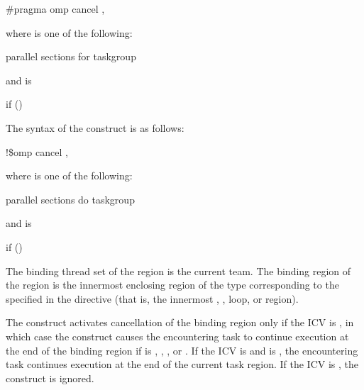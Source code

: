 {{{{\begin{boxedcode}
\#pragma omp cancel \plc{construct-type-clause [ [},\plc{] if-clause] new-line}
\end{boxedcode}

\begin{samepage}
where  is one of the following:

\begin{indentedcodelist}
parallel
sections
for
taskgroup
\end{indentedcodelist}
\end{samepage}

and  is
\begin{indentedcodelist}
if ()
\end{indentedcodelist}
\ccppspecificend

\fortranspecificstart
The syntax of the  construct is as follows:

\begin{boxedcode}
!\$omp cancel \plc{construct-type-clause [ [},\plc{] if-clause]}
\end{boxedcode}

\begin{samepage}
where  is one of the following:
\begin{indentedcodelist}
parallel
sections
do
taskgroup
\end{indentedcodelist}
\end{samepage}

and  is

\begin{indentedcodelist}
if ()
\end{indentedcodelist}
\fortranspecificend

\begin{samepage}

\binding
The binding thread set of the  region is the current team.
The binding region of the  region 
is the innermost enclosing region of the type corresponding to the  
specified in the directive (that is, the innermost , , loop, or 
 region).

\descr
The  construct activates cancellation of the binding region only if the  ICV
is , in which case the  construct causes the encountering task to continue execution 
at the end of the binding region if  is , , , or . 
If the  ICV is  and  is , the encountering task continues execution at the end of the current task region.
If the  ICV is , the  construct is 
ignored.


\end{samepage}}}}}
